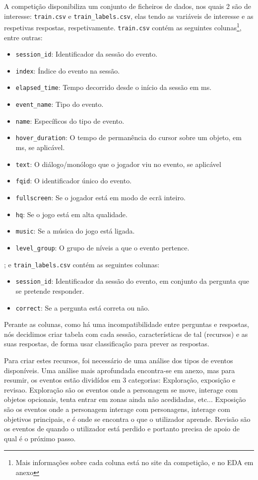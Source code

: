 \documentclass[justified, 11pt]{scrartcl}
\begin{document}
  A competição disponibiliza um conjunto de ficheiros de dados, nos quais 2 são de interesse: \texttt{train.csv} e \texttt{train\_labels.csv}, elas tendo as variáveis de interesse e as respetivas respostas, respetivamente. \texttt{train.csv} contém as seguintes colunas\footnote{Mais informações sobre cada coluna está no site da competição, e no EDA em anexo}, entre outras:
  \begin{itemize}
    \item \texttt{session\_id}: Identificador da sessão do evento.
    \item \texttt{index}: Índice do evento na sessão.
    \item \texttt{elapsed\_time}: Tempo decorrido desde o início da sessão em \si{\milli\second}.
    \item \texttt{event\_name}: Tipo do evento.
    \item \texttt{name}: Específicos do tipo de evento.
    \item \texttt{hover\_duration}: O tempo de permanência do cursor sobre um objeto, em \si{\milli\second}, se aplicável.
    \item \texttt{text}: O diálogo/monólogo que o jogador viu no evento, se aplicável
    \item \texttt{fqid}: O identificador único do evento.
    \item \texttt{fullscreen}: Se o jogador está em modo de ecrã inteiro.
    \item \texttt{hq}: Se o jogo está em alta qualidade.
    \item \texttt{music}: Se a música do jogo está ligada.
    \item \texttt{level\_group}: O grupo de níveis a que o evento pertence.
  \end{itemize}
  ; e \texttt{train\_labels.csv} contém as seguintes colunas:
  \begin{itemize}
    \item \texttt{session\_id}: Identificador da sessão do evento, em conjunto da pergunta que se pretende responder.
    \item \texttt{correct}: Se a pergunta está correta ou não.
  \end{itemize}

  Perante as colunas, como há uma incompatibilidade entre perguntas e respostas, nós decidimos criar tabela com cada sessão, características de tal (recursos) e as suas respostas, de forma usar classificação para prever as respostas.

  Para criar estes recursos, foi necessário de uma análise dos tipos de eventos disponíveis. Uma análise mais aprofundada encontra-se em anexo, mas para resumir, os eventos estão dividídos em 3 categorias: Exploração, exposição e revisao. Exploração são os eventos onde a personagem se move, interage com objetos opcionais, tenta entrar em zonas ainda não acedidadas, etc... Exposição são os eventos onde a personagem interage com personagens, interage com objetivos principais, e é onde se encontra o que o utilizador aprende. Revisão são os eventos de quando o utilizador está perdido e portanto precisa de apoio de qual é o próximo passo.
\end{document}
